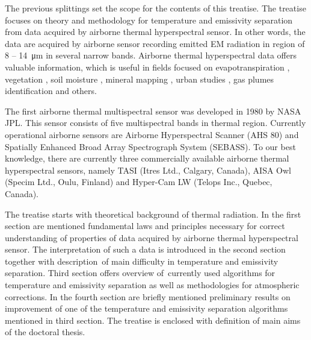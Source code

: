 The previous splittings set the scope for the contents of this treatise. The treatise focuses on theory and methodology for temperature and emissivity separation from data acquired by airborne thermal hyperspectral sensor. In other words, the data are acquired by airborne sensor recording emitted EM radiation in region of 8 – \SI{14}{\micro\meter} in several narrow bands. Airborne thermal hyperspectral data offers valuable information, which is useful in fields focused on evapotranspiration \cite{PP12}, vegetation \cite{RC10}, soil moisture \cite{SF12}, mineral mapping \cite{NK14}, urban studies \cite{SO12}, gas plumes identification \cite{PM05} and others.

The first airborne thermal multispectral sensor was developed in 1980 by NASA JPL. This sensor consists of five multispectral bands in thermal region. Currently operational airborne sensors are Airborne Hyperspectral Scanner (AHS 80) and Spatially Enhanced Broad Array Spectrograph System (SEBASS). To our best knowledge, there are currently three commercially available airborne thermal hyperspectral sensors, namely TASI (Itres Ltd., Calgary, Canada), AISA Owl (Specim Ltd., Oulu, Finland) and Hyper-Cam LW (Telops Inc., Quebec, Canada).

The treatise starts with theoretical background of thermal radiation. In the first section are mentioned fundamental laws and principles necessary for correct understanding of properties of data acquired by airborne thermal hyperspectral sensor. The interpretation of such a data is introduced in the second section together with description~of main difficulty in temperature and emissivity separation. Third section offers overview of~currently used algorithms for temperature and emissivity separation as well as methodologies for atmospheric corrections. In the fourth section are briefly mentioned preliminary results on improvement of one of the temperature and emissivity separation algorithms mentioned in third section. The treatise is enclosed with definition of main aims of the doctoral thesis.

